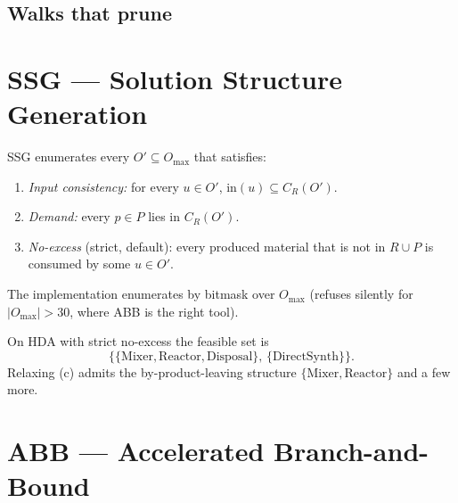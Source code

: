\documentclass[11pt,a4paper]{article}
\begin{document}
\subsection*{Walks that prune}

\begin{center}
\end{center}

\section{SSG --- Solution Structure Generation}

SSG enumerates every $O' \subseteq O_{\max}$ that satisfies:
\begin{enumerate}[label=(\alph*)]
\item \emph{Input consistency:} for every $u\in O'$,
      $\mathrm{in}(u) \subseteq C_R(O')$.
\item \emph{Demand:} every $p \in P$ lies in $C_R(O')$.
\item \emph{No-excess} (strict, default): every produced material
      that is not in $R \cup P$ is consumed by some $u\in O'$.
\end{enumerate}
The implementation enumerates by bitmask over $O_{\max}$ (refuses
silently for $|O_{\max}|>30$, where ABB is the right tool).

On HDA with strict no-excess the feasible set is
\[
\big\{\{\text{Mixer}, \text{Reactor}, \text{Disposal}\},\,
      \{\text{DirectSynth}\}\big\}.
\]
Relaxing (c) admits the by-product-leaving structure
$\{\text{Mixer}, \text{Reactor}\}$ and a few more.

\section{ABB --- Accelerated Branch-and-Bound}
\end{document}
